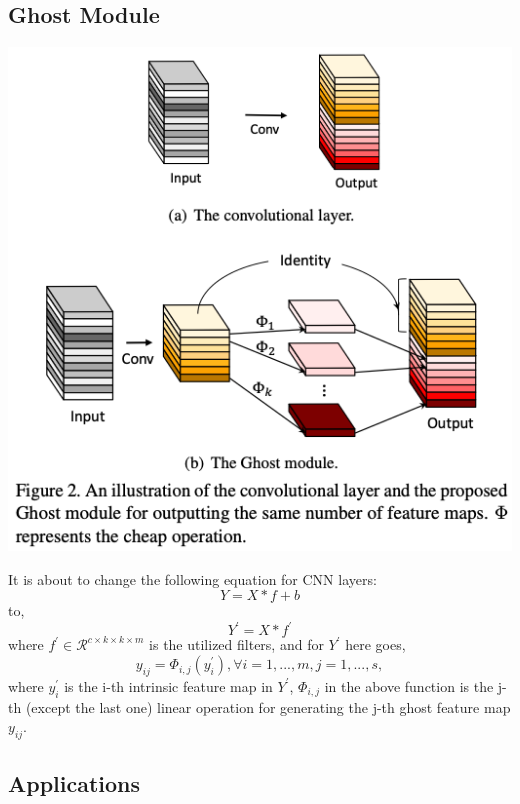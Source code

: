 \documentclass[12pt]{article}
\begin{document}
        \subsection{
            Ghost Module
        }
            \begin{center}
                \includegraphics[scale=0.6]{src/img/Ghost module.jpg} \\
            \end{center}
            It is about to change the following equation for CNN layers: \\
            $$
                Y = X * f + b
            $$
            to, 
            $$
                Y^{\prime} = X * f^{\prime}
            $$
            where $f^{\prime} \in \mathcal{R}^{c \times k \times k \times m}$ is the utilized filters, and for $Y^{\prime}$ here goes,
            $$
                y_{ij} = \Phi_{i,j}(y_i^{\prime}), \forall i = 1,...,m, j = 1,...,s,
            $$
            where $ y_i^{\prime} $ is the i-th intrinsic feature map in $ Y^{\prime} $, $ \Phi_{i,j} $ in the
            above function is the j-th (except the last one) linear operation for generating the j-th ghost feature map $ y_{ij} $. \\

        \subsection{
            Applications
        }
\end{document}
